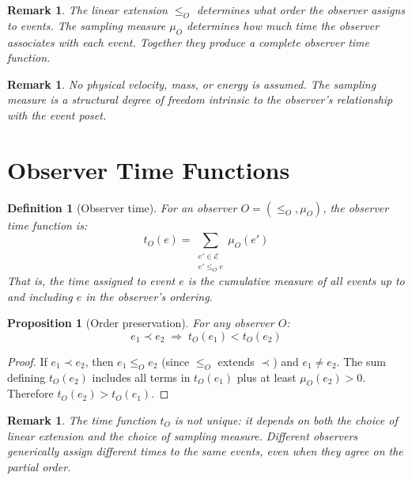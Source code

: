 \documentclass[12pt]{article}
\newtheorem{proposition}[theorem]{Proposition}
\newtheorem{definition}[theorem]{Definition}
\newtheorem{remark}[theorem]{Remark}
\newcommand{\Ecal}{\mathcal{E}}
\begin{document}
\begin{remark}
The linear extension $\leq_O$ determines \textit{what order} the observer assigns to events. The sampling measure $\mu_O$ determines \textit{how much time} the observer associates with each event. Together they produce a complete observer time function.
\end{remark}

\begin{remark}
No physical velocity, mass, or energy is assumed. The sampling measure is a structural degree of freedom intrinsic to the observer's relationship with the event poset.
\end{remark}

\section{Observer Time Functions}\label{sec:time}

\begin{definition}[Observer time]\label{def:time}
For an observer $O = (\leq_O, \mu_O)$, the \textit{observer time function} is:
\begin{equation}\label{eq:time}
    t_O(e) = \sum_{\substack{e' \in \Ecal \\ e' \leq_O e}} \mu_O(e')
\end{equation}
That is, the time assigned to event $e$ is the cumulative measure of all events up to and including $e$ in the observer's ordering.
\end{definition}

\begin{proposition}[Order preservation]\label{prop:preserve}
For any observer $O$:
\begin{equation}
    e_1 \prec e_2 \;\Rightarrow\; t_O(e_1) < t_O(e_2)
\end{equation}
\end{proposition}

\begin{proof}
If $e_1 \prec e_2$, then $e_1 \leq_O e_2$ (since $\leq_O$ extends $\prec$) and $e_1 \neq e_2$. The sum defining $t_O(e_2)$ includes all terms in $t_O(e_1)$ plus at least $\mu_O(e_2) > 0$. Therefore $t_O(e_2) > t_O(e_1)$.
\end{proof}

\begin{remark}
The time function $t_O$ is not unique: it depends on both the choice of linear extension and the choice of sampling measure. Different observers generically assign different times to the same events, even when they agree on the partial order.
\end{remark}
\end{document}
